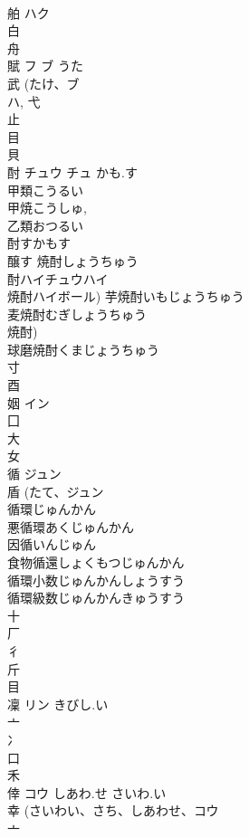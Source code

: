\documentclass[8pt]{extreport}
\begin{document}
\begin{CJK}{UTF8}{min}
\\	舶	ハク		
\\	白 
\\	舟 
\\	賦	フ ブ	うた	
\\	武 (たけ、ブ 
\\	ハ, 弋 
\\	止 
\\	目 
\\	貝 
\\	酎	チュウ チュ	かも.す	
\\	甲類こうるい 
\\	甲焼こうしゅ, 
\\	乙類おつるい 
\\	酎すかもす 
\\	醸す 焼酎しょうちゅう 
\\	酎ハイチュウハイ 
\\	焼酎ハイボール) 芋焼酎いもじょうちゅう 
\\	麦焼酎むぎしょうちゅう 
\\	焼酎)
\\	球磨焼酎くまじょうちゅう 
\\	寸 
\\	酉 
\\	姻	イン		
\\	囗 
\\	大 
\\	女 
\\	循	ジュン		
\\	盾 (たて、ジュン 
\\	循環じゅんかん
\\	悪循環あくじゅんかん
\\	因循いんじゅん
\\	食物循還しょくもつじゅんかん
\\	循環小数じゅんかんしょうすう
\\	循環級数じゅんかんきゅうすう
\\	十 
\\	厂 
\\	彳 
\\	斤 
\\	目 
\\	凜	リン	きびし.い	
\\	亠 
\\	冫 
\\	口 
\\	禾 
\\	倖	コウ	しあわ.せ さいわ.い	
\\	幸 (さいわい、さち、しあわせ、コウ 
\\	亠 

\end{CJK}
\end{document}
